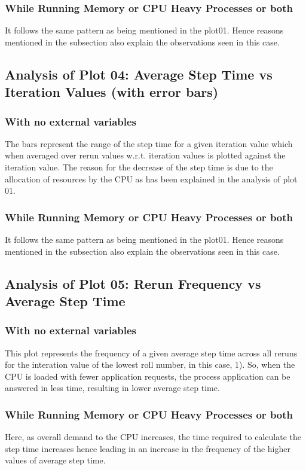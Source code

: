 \documentclass[11pt]{article}
\begin{document}
\subsubsection*{While Running Memory or CPU Heavy Processes or both}
It follows the same pattern as being mentioned in the plot01. Hence reasons mentioned in the subsection also explain the observations seen in this case.
\subsection{Analysis of Plot 04: Average Step Time vs Iteration Values (with error bars)}
\subsubsection { With no external variables}
The bars represent the range of the step time for a given iteration value which when averaged over rerun values w.r.t. iteration values is plotted against the iteration value. The reason for the decrease of the step time is due to the allocation of resources by the CPU as has been explained in the analysis of plot 01.

\subsubsection{While Running Memory or CPU Heavy Processes or both}
It follows the same pattern as being mentioned in the plot01. Hence reasons mentioned in the subsection also explain the observations seen in this case.
\subsection{Analysis of Plot 05: Rerun Frequency vs Average Step Time}
\subsubsection { With no external variables}
This plot represents the frequency of a given average step time across all reruns for the interation value of the lowest roll number, in this case, 1).
So, when the CPU is loaded with fewer application requests, the process application can be answered in less time, resulting in lower average step time.

\subsubsection {While Running Memory or CPU Heavy Processes or both}
Here, as overall demand to the CPU increases, the time required to calculate the step time increases hence leading in an increase in the frequency of the higher values of average step time.
\end{document}
